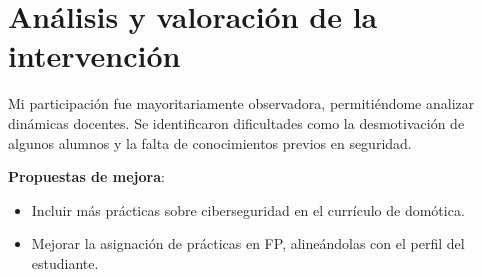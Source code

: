 \chapter{Análisis y valoración de la intervención}
Mi participación fue mayoritariamente observadora, permitiéndome analizar dinámicas docentes. Se identificaron dificultades como la desmotivación de algunos alumnos y la falta de conocimientos previos en seguridad.

\textbf{Propuestas de mejora}:
\begin{itemize}
    \item Incluir más prácticas sobre ciberseguridad en el currículo de domótica.
    \item Mejorar la asignación de prácticas en FP, alineándolas con el perfil del estudiante.
\end{itemize}
